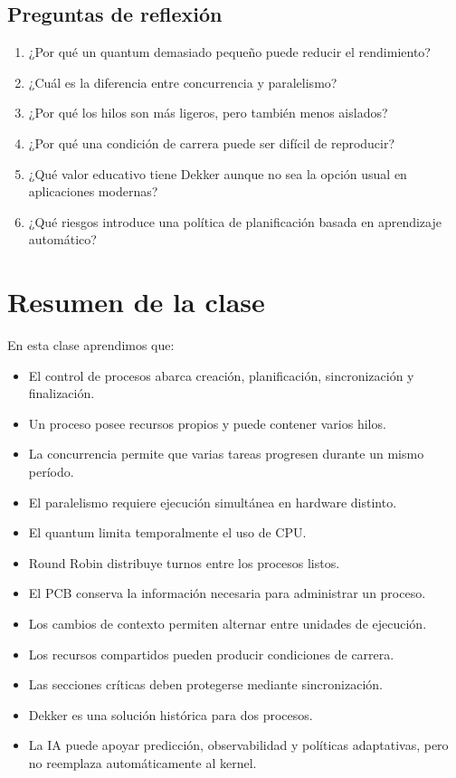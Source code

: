 \documentclass[
  spanish,
  letterpaper,
]{scrbook}
\providecommand{\tightlist}{%
  \setlength{\itemsep}{0pt}\setlength{\parskip}{0pt}}
\begin{document}
\section{Preguntas de reflexión}\label{preguntas-de-reflexiuxf3n-1}

\begin{enumerate}
\def\labelenumi{\arabic{enumi}.}
\tightlist
\item
  ¿Por qué un quantum demasiado pequeño puede reducir el rendimiento?
\item
  ¿Cuál es la diferencia entre concurrencia y paralelismo?
\item
  ¿Por qué los hilos son más ligeros, pero también menos aislados?
\item
  ¿Por qué una condición de carrera puede ser difícil de reproducir?
\item
  ¿Qué valor educativo tiene Dekker aunque no sea la opción usual en
  aplicaciones modernas?
\item
  ¿Qué riesgos introduce una política de planificación basada en
  aprendizaje automático?
\end{enumerate}


\chapter{Resumen de la clase}\label{resumen-de-la-clase-3}

En esta clase aprendimos que:

\begin{itemize}
\tightlist
\item
  El control de procesos abarca creación, planificación, sincronización
  y finalización.
\item
  Un proceso posee recursos propios y puede contener varios hilos.
\item
  La concurrencia permite que varias tareas progresen durante un mismo
  período.
\item
  El paralelismo requiere ejecución simultánea en hardware distinto.
\item
  El quantum limita temporalmente el uso de CPU.
\item
  Round Robin distribuye turnos entre los procesos listos.
\item
  El PCB conserva la información necesaria para administrar un proceso.
\item
  Los cambios de contexto permiten alternar entre unidades de ejecución.
\item
  Los recursos compartidos pueden producir condiciones de carrera.
\item
  Las secciones críticas deben protegerse mediante sincronización.
\item
  Dekker es una solución histórica para dos procesos.
\item
  La IA puede apoyar predicción, observabilidad y políticas adaptativas,
  pero no reemplaza automáticamente al kernel.
\end{itemize}
\end{document}

